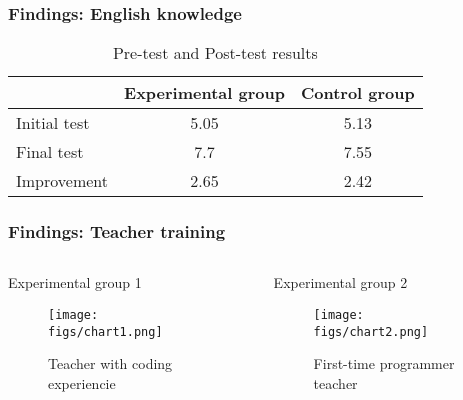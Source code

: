 \documentclass{beamer}
\begin{document}
\usebackgroundtemplate{}


\begin{frame}
\frametitle{Findings: English knowledge}

\begin{table}
\begin{center}
  \begin{tabular}{ | l | c | c | }
   \hline
              & Experimental group & Control group \\ \hline\hline
    Initial test & 5.05 & 5.13 \\ \hline
    Final test & 7.7 & 7.55 \\ \hline
    Improvement & 2.65 & 2.42 \\ \hline
  \end{tabular}
\end{center}
\caption{Pre-test and Post-test results}
\label{table:results}
\end{table}
\end{frame}

\begin{frame}
\frametitle{Findings: Teacher training}

  \begin{columns}[T]
    \begin{column}{0.5\textwidth}
 
     \begin{block}{Experimental group 1}
\begin{figure}[t!]
\begin{center}
\texttt{[image: figs/chart1.png]}
\end{center}
Teacher with coding experiencie
\label{fig:results1}
\end{figure}
     \end{block}
    \end{column}
    \begin{column}{0.5\textwidth}
     \begin{block}{Experimental group 2}
\begin{figure}[t!]
\begin{center}
\texttt{[image: figs/chart2.png]}
\end{center}
First-time programmer teacher
\label{fig:results2}
\end{figure}
     \end{block}

    \end{column}
  \end{columns}

\end{frame}
\end{document}
